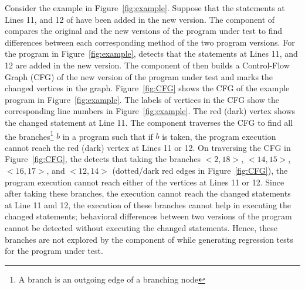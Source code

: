 	Consider the example in Figure~\ref{fig:example}. Suppose that the statements at Lines 11, and 12 of  have been added in the new version.
	The  component of  compares the original and the new versions of the program under test to find differences between each corresponding method of the two program versions. For the program in Figure~\ref{fig:example},  detects that the statements at Lines 11, and 12 are added in the new version. The  component of  then builds a Control-Flow Graph (CFG) of the new version of  the program under test and marks the changed vertices in the graph. Figure~\ref{fig:CFG} shows the CFG of the example program in Figure~\ref{fig:example}. The labels of vertices in the CFG show the corresponding line numbers in Figure~\ref{fig:example}. The red (dark) vertex shows the changed statement at Line 11. The  component traverses the CFG to find all the branches\footnote{A branch is an outgoing edge of a branching node} $b$ in a program such that if $b$ is taken, the program execution cannot reach the red (dark) vertex at Lines 11 or 12. 
	On traversing the CFG in Figure~\ref{fig:CFG}, the  detects that taking the branches $<2, 18>$, $<14, 15>$, $<16, 17>$, and $<12, 14>$ (dotted/dark red edges in Figure~\ref{fig:CFG}), the program execution cannot reach either of the vertices at Lines 11 or 12. Since after taking these branches, the execution cannot reach the changed statements at Line 11 and 12, the execution of these branches cannot help in executing the changed statements; behavioral differences between two versions of the program cannot be detected without executing the changed statements. Hence, these branches are not explored by the  component of  while generating regression tests for the program under test. 
